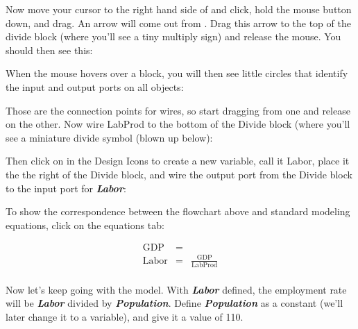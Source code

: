 Now move your cursor to the right hand side of
  and click, hold the mouse button down, and
drag. An arrow will come out from  . Drag
this arrow to the top of the divide block (where you'll see a tiny
multiply sign) and release the mouse. You should then see this: 

\begin{center}
\end{center}


When the mouse hovers over a block, you will then see little
circles that identify the input and output ports on all objects: 

\begin{center}
\end{center}

Those are the connection points for wires, so start dragging from one
and release on the other. Now wire LabProd to the bottom of the Divide
block (where you'll see a miniature divide symbol (blown up below): 

\begin{center}
\end{center}

Then click on  in the Design Icons to create a new variable, call it
Labor, place it the the right of the Divide block, and wire the output port from the Divide block to the
input port for {\bf\em Labor}: 

\begin{center}
\end{center}


To show the correspondence between the flowchart above and standard
modeling equations, click on the equations tab: 

\begin{eqnarray*}
\mathrm{GDP}&=&\\
\mathrm{Labor}&=&\frac{\mathrm{GDP}}{\mathrm{LabProd}}\\
\end{eqnarray*}

Now let's keep going with the model. With {\bf\em Labor} defined, the
employment rate will be {\bf\em  Labor} divided by {\bf\em
Population}. Define {\bf\em Population} as a constant (we'll later
change it to a variable), and give it a value of 110. 

\begin{center}
\end{center}

